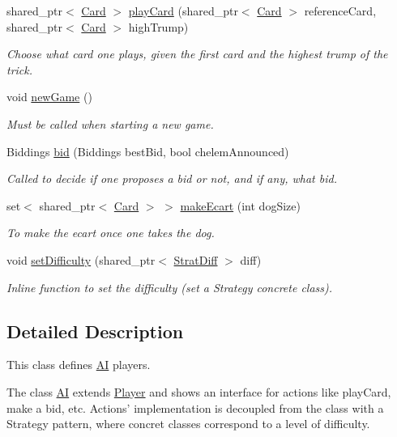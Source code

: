 \begin{DoxyCompactItemize}
shared\-\_\-ptr$<$ \hyperlink{classCard}{\-Card} $>$ \hyperlink{classAI_a3f5b2888e03634db701c66f82a4f03a8}{play\-Card} (shared\-\_\-ptr$<$ \hyperlink{classCard}{\-Card} $>$ reference\-Card, shared\-\_\-ptr$<$ \hyperlink{classCard}{\-Card} $>$ high\-Trump)
\begin{DoxyCompactList}\small\item\em \-Choose what card one plays, given the first card and the highest trump of the trick. \end{DoxyCompactList}\item 
void \hyperlink{classAI_a6cda26d3bf7238b1a7ea3725bf4aabb7}{new\-Game} ()
\begin{DoxyCompactList}\small\item\em \-Must be called when starting a new game. \end{DoxyCompactList}\item 
\-Biddings \hyperlink{classAI_a168d96ab354298c316faa905418cfb57}{bid} (\-Biddings best\-Bid, bool chelem\-Announced)
\begin{DoxyCompactList}\small\item\em \-Called to decide if one proposes a bid or not, and if any, what bid. \end{DoxyCompactList}\item 
set$<$ shared\-\_\-ptr$<$ \hyperlink{classCard}{\-Card} $>$ $>$ \hyperlink{classAI_a7a7df533ccc838f818a1ee94c4153fe0}{make\-Ecart} (int dog\-Size)
\begin{DoxyCompactList}\small\item\em \-To make the ecart once one takes the dog. \end{DoxyCompactList}\item 
void \hyperlink{classAI_a19cae044bb7f221819f61b017b6a7ffe}{set\-Difficulty} (shared\-\_\-ptr$<$ \hyperlink{classStratDiff}{\-Strat\-Diff} $>$ diff)
\begin{DoxyCompactList}\small\item\em \-Inline function to set the difficulty (set a \-Strategy concrete class). \end{DoxyCompactList}\end{DoxyCompactItemize}


\subsection{\-Detailed \-Description}
\-This class defines \hyperlink{classAI}{\-A\-I} players. 

\-The class \hyperlink{classAI}{\-A\-I} extends \hyperlink{classPlayer}{\-Player} and shows an interface for actions like play\-Card, make a bid, etc. \-Actions' implementation is decoupled from the class with a \-Strategy pattern, where concret classes correspond to a level of difficulty. 

